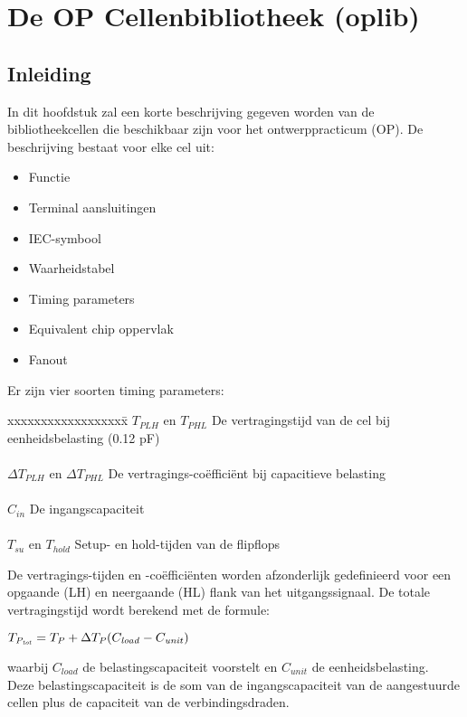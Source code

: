 \section{De OP Cellenbibliotheek (oplib)}

\subsection{Inleiding}

In dit hoofdstuk zal een korte beschrijving gegeven worden van de bibliotheekcellen die beschikbaar zijn voor het ontwerppracticum (OP).
De beschrijving bestaat voor elke cel uit:
\begin{itemize}
\item
Functie
\item
Terminal aansluitingen
\item
IEC-symbool
\item
Waarheidstabel
\item
Timing parameters
\item
Equivalent chip oppervlak
\item
Fanout
\end{itemize}

Er zijn vier soorten timing parameters:
\begin{tabbing}
xxxxxxxxxxxxxxxxxx\=\kill
$T_{PLH}$ en $T_{PHL}$\> De vertragingstijd van de cel bij eenheidsbelasting (0.12 pF)\\
\\
${\Delta}T_{PLH}$ en ${\Delta}T_{PHL}$\> De vertragings-co\"effici\"ent bij capacitieve belasting\\
\\
$C_{in}$\> De ingangscapaciteit\\
\\
$T_{su}$ en $T_{hold}$\> Setup- en hold-tijden van de flipflops
\end{tabbing}
De vertragings-tijden en -co\"effici\"enten worden afzonderlijk gedefinieerd voor een opgaande (LH) en neergaande (HL) flank van het uitgangssignaal. 
De totale vertragingstijd wordt berekend met de formule:
\begin{description}
\item
$T_{\it P_{tot}} = T_{\it P} + \Delta T_{\it P}(C_{\it load}-C_{\it unit})$
\end{description}
waarbij $C_{load}$ de belastingscapaciteit voorstelt en $C_{unit}$ de eenheidsbelasting.\\
Deze belastingscapaciteit is de som van de ingangscapaciteit van de aangestuurde cellen plus de capaciteit van de verbindingsdraden.
 
